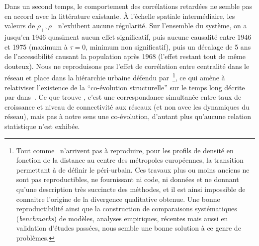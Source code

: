 {Dans un second temps, le comportement des corrélations retardées ne semble pas en accord avec la littérature existante. À l'échelle spatiale intermédiaire, les valeurs de $\rho_+,\rho_-$ n'exhibent aucune régularité. Sur l'ensemble du système, on a jusqu'en 1946 quasiment aucun effet significatif, puis aucune causalité entre 1946 et 1975 (maximum à $\tau = 0$, minimum non significatif), puis un décalage de 5 ans de l'accessibilité causant la population après 1968 (l'effet restant tout de même douteux). Nous ne reproduisons pas l'effet de corrélation entre centralité dans le réseau et place dans la hiérarchie urbaine défendu par~\cite{bretagnolle2003vitesse}\footnote{Tout comme~\cite{lemoy2017scaling} n'arrivent pas à reproduire, pour les profils de densité en fonction de la distance au centre des métropoles européennes, la transition permettant à \cite{guerois2008built} de définir le péri-urbain. Ces travaux plus ou moins anciens ne sont pas reproductibles, ne fournissant ni code, ni données et ne donnant qu'une description très succincte des méthodes, et il est ainsi impossible de connaitre l'origine de la divergence qualitative obtenue. Une bonne reproductibilité ainsi que la construction de comparaisons systématiques (\emph{benchmarks}) de modèles, analyses empiriques, récentes mais aussi en validation d'études passées, nous semble une bonne solution à ce genre de problèmes.}, ce qui amène à relativiser l'existence de la ``co-évolution structurelle'' sur le temps long décrite par  dans~\cite{espacegeo2014effets}. Ce que trouve \cite{bretagnolle2003vitesse}, c'est une correspondance simultanée entre taux de croissance et niveau de connectivité aux réseaux (et non avec les dynamiques du réseau), mais pas à notre sens une co-évolution, d'autant plus qu'aucune relation statistique n'est exhibée.
}





